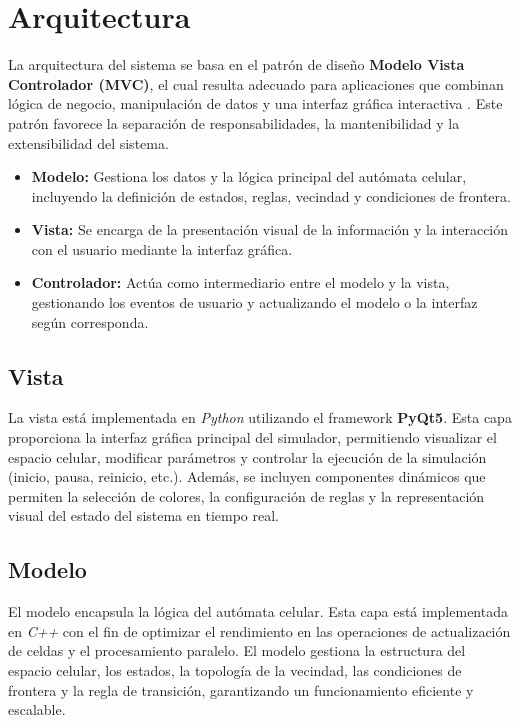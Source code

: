 \section{Arquitectura}

La arquitectura del sistema se basa en el patrón de diseño \textbf{Modelo Vista Controlador (MVC)}, el cual resulta adecuado para aplicaciones que combinan lógica de negocio, manipulación de datos y una interfaz gráfica interactiva \cite{mvc}. Este patrón favorece la separación de responsabilidades, la mantenibilidad y la extensibilidad del sistema. 

\begin{itemize}
	\item \textbf{Modelo:} Gestiona los datos y la lógica principal del autómata celular, incluyendo la definición de estados, reglas, vecindad y condiciones de frontera.
	\item \textbf{Vista:} Se encarga de la presentación visual de la información y la interacción con el usuario mediante la interfaz gráfica.
	\item \textbf{Controlador:} Actúa como intermediario entre el modelo y la vista, gestionando los eventos de usuario y actualizando el modelo o la interfaz según corresponda.
\end{itemize}

\subsection{Vista}

La vista está implementada en \textit{Python} utilizando el framework \textbf{PyQt5}. Esta capa proporciona la interfaz gráfica principal del simulador, permitiendo visualizar el espacio celular, modificar parámetros y controlar la ejecución de la simulación (inicio, pausa, reinicio, etc.). Además, se incluyen componentes dinámicos que permiten la selección de colores, la configuración de reglas y la representación visual del estado del sistema en tiempo real.

\subsection{Modelo}

El modelo encapsula la lógica del autómata celular. Esta capa está implementada en \textit{C++} con el fin de optimizar el rendimiento en las operaciones de actualización de celdas y el procesamiento paralelo. El modelo gestiona la estructura del espacio celular, los estados, la topología de la vecindad, las condiciones de frontera y la regla de transición, garantizando un funcionamiento eficiente y escalable.

